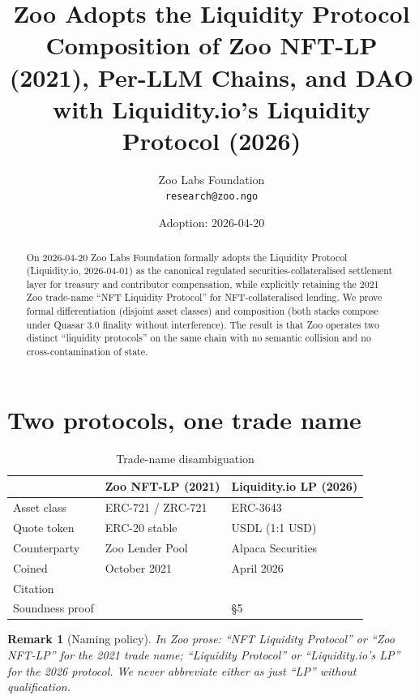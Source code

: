 \documentclass[11pt]{article}
\title{Zoo Adopts the Liquidity Protocol\\
{\large Composition of Zoo NFT-LP (2021), Per-LLM Chains, and DAO
with Liquidity.io's Liquidity Protocol (2026)}}
\author{Zoo Labs Foundation\\
\texttt{research@zoo.ngo}}
\date{Adoption: 2026-04-20}
\newtheorem{remark}{Remark}
\begin{document}
\maketitle

\begin{abstract}
On 2026-04-20 Zoo Labs Foundation formally adopts the Liquidity
Protocol (Liquidity.io, 2026-04-01) as the canonical regulated
securities-collateralised settlement layer for treasury and
contributor compensation, while explicitly retaining the
2021 Zoo trade-name ``NFT Liquidity Protocol'' for
NFT-collateralised lending. We prove formal differentiation
(disjoint asset classes) and composition (both stacks compose under
Quasar 3.0 finality without interference). The result is that Zoo
operates two distinct ``liquidity protocols'' on the same chain
with no semantic collision and no cross-contamination of state.
\end{abstract}

\tableofcontents

\section{Two protocols, one trade name}
\label{sec:two}

\begin{table}[h]
\centering
\caption{Trade-name disambiguation}
\begin{tabular}{lll}
\toprule
& Zoo NFT-LP (2021) & Liquidity.io LP (2026) \\
\midrule
Asset class      & ERC-721 / ZRC-721         & ERC-3643 \\
Quote token      & ERC-20 stable             & USDL (1:1 USD) \\
Counterparty     & Zoo Lender Pool           & Alpaca Securities \\
Coined           & October 2021              & April 2026 \\
Citation         & \cite{zoo-2021}           & \cite{liquidity-lp} \\
Soundness proof  & \cite{zoo-nft-lp}         & \cite{liquidity-lp} \S5 \\
\bottomrule
\end{tabular}
\end{table}

\begin{remark}[Naming policy]
In Zoo prose: ``NFT Liquidity Protocol'' or ``Zoo NFT-LP'' for the
2021 trade name; ``Liquidity Protocol'' or ``Liquidity.io's LP'' for
the 2026 protocol. We never abbreviate either as just ``LP'' without
qualification.
\end{remark}
\end{document}
